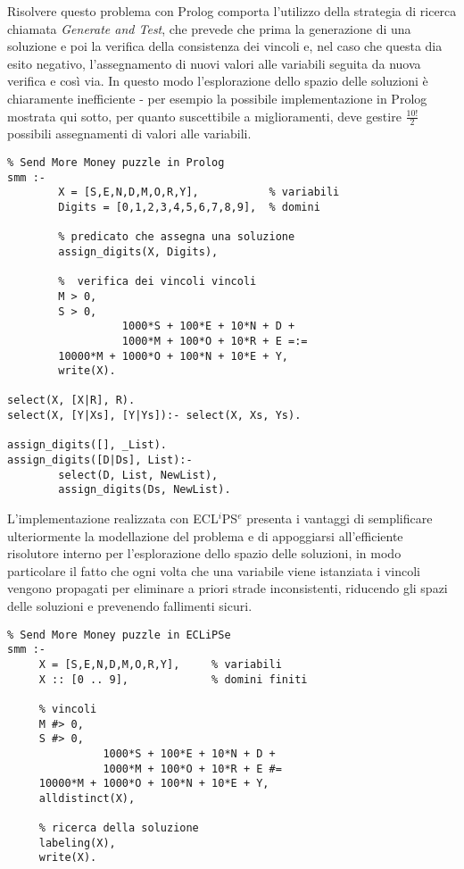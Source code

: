\documentclass[12pt,a4paper,openright,twoside]{report}
\begin{document}
Risolvere questo problema con Prolog comporta l'utilizzo della strategia di ricerca chiamata \emph{Generate and Test}, che prevede che prima la generazione di una soluzione e poi la verifica della consistenza dei vincoli e, nel caso che questa dia esito negativo, l'assegnamento di nuovi valori alle variabili seguita da nuova verifica e così via. In questo modo l'esplorazione dello spazio delle soluzioni è chiaramente inefficiente - per esempio la possibile implementazione in Prolog mostrata qui sotto, per quanto suscettibile a miglioramenti, deve gestire $\frac{10!}{2}$ possibili assegnamenti di valori alle variabili. 

\lstset{language=Prolog}
\begin{lstlisting}
% Send More Money puzzle in Prolog
smm :-
        X = [S,E,N,D,M,O,R,Y],           % variabili
        Digits = [0,1,2,3,4,5,6,7,8,9],	 % domini
        
        % predicato che assegna una soluzione
        assign_digits(X, Digits),
       	
       	%  verifica dei vincoli vincoli
        M > 0, 
        S > 0,
                  1000*S + 100*E + 10*N + D +
                  1000*M + 100*O + 10*R + E =:=
        10000*M + 1000*O + 100*N + 10*E + Y,
        write(X).

select(X, [X|R], R).
select(X, [Y|Xs], [Y|Ys]):- select(X, Xs, Ys).

assign_digits([], _List).
assign_digits([D|Ds], List):-
        select(D, List, NewList),
        assign_digits(Ds, NewList).
\end{lstlisting}

L'implementazione realizzata con ECL$^i$PS$^e$ presenta i vantaggi di semplificare ulteriormente la modellazione del problema e di appoggiarsi all'efficiente risolutore interno per l'esplorazione dello spazio delle soluzioni, in modo particolare il fatto che ogni volta che una variabile viene istanziata i vincoli vengono propagati per eliminare a priori strade inconsistenti, riducendo gli spazi delle soluzioni e prevenendo fallimenti sicuri. 

\begin{lstlisting}
% Send More Money puzzle in ECLiPSe
smm :-
     X = [S,E,N,D,M,O,R,Y],		% variabili
     X :: [0 .. 9],				% domini finiti
     
     % vincoli
     M #> 0,
     S #> 0,
               1000*S + 100*E + 10*N + D +
               1000*M + 100*O + 10*R + E #=
     10000*M + 1000*O + 100*N + 10*E + Y,
     alldistinct(X),
     
     % ricerca della soluzione
     labeling(X),
     write(X).

\end{lstlisting}
\end{document}
